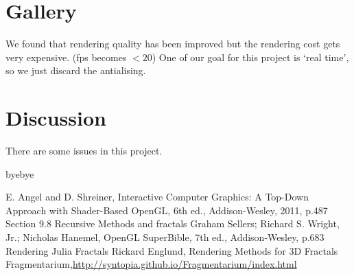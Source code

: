 \documentclass[a4paper]{article}
\begin{document}
\section{Gallery}


We found that rendering quality has been improved but the rendering cost gets very expensive. (fps becomes $<20$)
One of our goal for this project is `real time', so we just discard the antialising.

\section{Discussion}
There are some issues in this project.
\begin{description}[style=nextline]
\item[hihi?]
byebye
\end{description}

\begin{thebibliography}{1}
E. Angel and D. Shreiner, Interactive Computer Graphics: A Top-Down Approach with Shader-Based OpenGL, 6th ed., Addison-Wesley, 2011, p.487 Section 9.8 Recursive Methods and fractals
Graham Sellers; Richard S. Wright, Jr.; Nicholas Hanemel, OpenGL SuperBible, 7th ed., Addison-Wesley, p.683 Rendering Julia Fractals
Rickard Englund, Rendering Methods for 3D Fractals
Fragmentarium,\url{http://syntopia.github.io/Fragmentarium/index.html}
\end{thebibliography}
\end{document}
